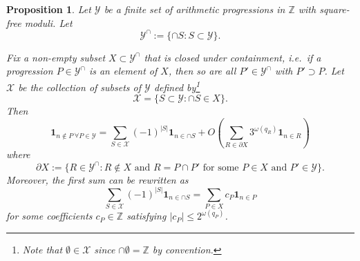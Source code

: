 \documentclass[11pt]{amsart}
\newtheorem{proposition}[theorem]{Proposition}
\theoremstyle{definition}
\renewcommand{\leq}{\leqslant}
\newcommand{\ind}[1]{\mathbf{1}_{#1}}
\newcommand{\Z}{\mathbb{Z}}
\newcommand{\prohibprog}{\mathcal{Y}}
\newcommand{\modulus}{q}
\newcommand{\appendixsubcoll}{\mathcal{X}}
\begin{document}
\begin{proposition}
\label{prop:sievesquare-free}
Let $\prohibprog$ be a finite set of arithmetic progressions in $\Z$ with square-free moduli. Let 
\begin{equation*}
\prohibprog^{\cap} := \{\cap S : S \subset \prohibprog\}.
\end{equation*}

Fix a non-empty subset $X \subset \prohibprog^{\cap}$ that is closed under containment, i.e.~if a progression $P\in \prohibprog^{\cap}$ is an element of $X$, then so are all $P'\in \prohibprog^{\cap}$ with $P' \supset P$. Let $\appendixsubcoll$ be the collection of subsets of $\prohibprog$ defined by\footnote{Note that $\emptyset \in \appendixsubcoll$ since $\cap \emptyset = \Z$ by convention.}
\begin{equation*}
\appendixsubcoll = \{S \subset \prohibprog: \cap S \in X\}.
\end{equation*}
Then
\begin{equation}
\label{eq:bonferronilike}
	\ind{n\not\in P\  \forall P\in \prohibprog}  = \sum_{S\in \appendixsubcoll} (-1)^{|S|} \ind{n \in \cap S}  + O \left(\sum_{R\in \partial X }  3^{\omega(\modulus_{R})} \ind{n\in R}\right)
\end{equation}
where
\begin{equation*}
\partial X := \{R\in \prohibprog^{\cap}: R\not\in X \text{ and }R = P\cap P'\text{ for some } P\in X \text{ and }P'\in \prohibprog \}.
\end{equation*}
Moreover, the first sum can be rewritten as
\begin{equation*}
\sum_{S\in \appendixsubcoll} (-1)^{|S|} \ind{n \in \cap S} = \sum_{P\in X } c_{P} \ind{n\in P}
\end{equation*}
for some coefficients $c_{P}\in \Z$ satisfying $|c_{P}| \leq 2^{\omega(\modulus_{P})}$.
\end{proposition}
\end{document}
